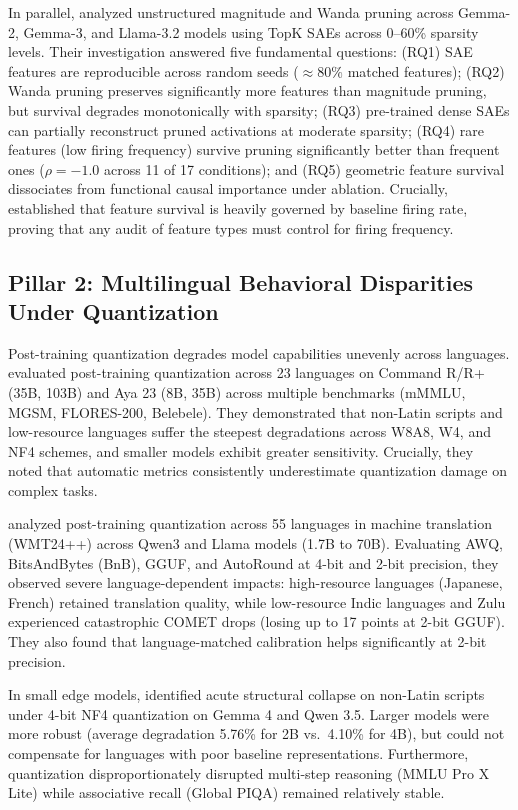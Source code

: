 \documentclass[11pt]{article}
\begin{document}
In parallel, \citet{borobia2026how} analyzed unstructured magnitude and Wanda pruning across Gemma-2, Gemma-3, and Llama-3.2 models using TopK SAEs across 0--60\% sparsity levels. Their investigation answered five fundamental questions: (RQ1) SAE features are reproducible across random seeds ($\approx 80\%$ matched features); (RQ2) Wanda pruning preserves significantly more features than magnitude pruning, but survival degrades monotonically with sparsity; (RQ3) pre-trained dense SAEs can partially reconstruct pruned activations at moderate sparsity; (RQ4) rare features (low firing frequency) survive pruning significantly better than frequent ones ($\rho = -1.0$ across 11 of 17 conditions); and (RQ5) geometric feature survival dissociates from functional causal importance under ablation. Crucially, \citet{borobia2026how} established that feature survival is heavily governed by baseline firing rate, proving that any audit of feature types must control for firing frequency.

\subsection{Pillar 2: Multilingual Behavioral Disparities Under Quantization}
Post-training quantization degrades model capabilities unevenly across languages. \citet{marchisio2024quantization} evaluated post-training quantization across 23 languages on Command R/R+ (35B, 103B) and Aya 23 (8B, 35B) across multiple benchmarks (mMMLU, MGSM, FLORES-200, Belebele). They demonstrated that non-Latin scripts and low-resource languages suffer the steepest degradations across W8A8, W4, and NF4 schemes, and smaller models exhibit greater sensitivity. Crucially, they noted that automatic metrics consistently underestimate quantization damage on complex tasks.

\citet{marie2025uneven} analyzed post-training quantization across 55 languages in machine translation (WMT24++) across Qwen3 and Llama models (1.7B to 70B). Evaluating AWQ, BitsAndBytes (BnB), GGUF, and AutoRound at 4-bit and 2-bit precision, they observed severe language-dependent impacts: high-resource languages (Japanese, French) retained translation quality, while low-resource Indic languages and Zulu experienced catastrophic COMET drops (losing up to 17 points at 2-bit GGUF). They also found that language-matched calibration helps significantly at 2-bit precision.

In small edge models, \citet{soualhi2026multilingual} identified acute structural collapse on non-Latin scripts under 4-bit NF4 quantization on Gemma 4 and Qwen 3.5. Larger models were more robust (average degradation 5.76\% for 2B vs.\ 4.10\% for 4B), but could not compensate for languages with poor baseline representations. Furthermore, quantization disproportionately disrupted multi-step reasoning (MMLU Pro X Lite) while associative recall (Global PIQA) remained relatively stable.
\end{document}
